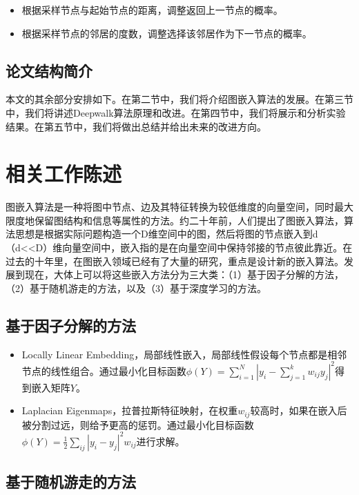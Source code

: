 \documentclass{ctexart}
\begin{document}
\begin{itemize}
    \item 根据采样节点与起始节点的距离，调整返回上一节点的概率。
    \item 根据采样节点的邻居的度数，调整选择该邻居作为下一节点的概率。
\end{itemize}

\subsection{论文结构简介}

本文的其余部分安排如下。在第二节中，我们将介绍图嵌入算法的发展。在第三节中，我们将讲述Deepwalk算法原理和改进。在第四节中，我们将展示和分析实验结果。在第五节中，我们将做出总结并给出未来的改进方向。

\section{相关工作陈述}

图嵌入算法是一种将图中节点、边及其特征转换为较低维度的向量空间，同时最大限度地保留图结构和信息等属性的方法。约二十年前，人们提出了图嵌入算法，算法思想是根据实际问题构造一个D维空间中的图，然后将图的节点嵌入到d（d<<D）维向量空间中，嵌入指的是在向量空间中保持邻接的节点彼此靠近。在过去的十年里，在图嵌入领域已经有了大量的研究，重点是设计新的嵌入算法。发展到现在，大体上可以将这些嵌入方法分为三大类：（1）基于因子分解的方法，（2）基于随机游走的方法，以及（3）基于深度学习的方法\cite{goyal2018graph}。

\subsection{基于因子分解的方法}

\begin{itemize}
    \item Locally Linear Embedding，局部线性嵌入，局部线性假设每个节点都是相邻节点的线性组合。通过最小化目标函数$\phi(Y)=\sum_{i=1}^N|y_i-\sum_{j=1}^kw_{ij}y_j|^2$得到嵌入矩阵$Y$。
    \item Laplacian Eigenmaps，拉普拉斯特征映射，在权重$w_{ij}$较高时，如果在嵌入后被分割过远，则给予更高的惩罚。通过最小化目标函数$\phi(Y)=\frac{1}{2}\sum_{ij} |y_i-y_j|^2w_{ij}$进行求解。
\end{itemize}

\subsection{基于随机游走的方法}
\end{document}
